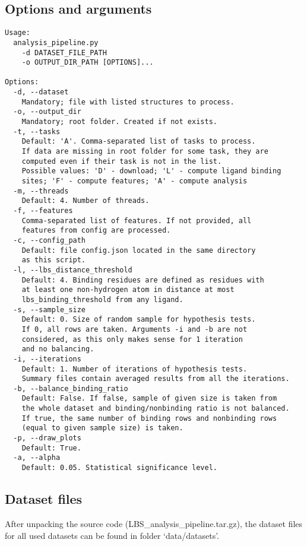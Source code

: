 \documentclass[12pt,a4paper]{report}
\begin{document}
\subsection{Options and arguments}
\begin{Verbatim}[fontsize=\small]
Usage:
  analysis_pipeline.py 
  	-d DATASET_FILE_PATH
  	-o OUTPUT_DIR_PATH [OPTIONS]... 

Options:
  -d, --dataset                
  	Mandatory; file with listed structures to process.
  -o, --output_dir             
  	Mandatory; root folder. Created if not exists.
  -t, --tasks                  
  	Default: 'A'. Comma-separated list of tasks to process. 
  	If data are missing in root folder for some task, they are 
  	computed even if their task is not in the list.
  	Possible values: 'D' - download; 'L' - compute ligand binding 
  	sites; 'F' - compute features; 'A' - compute analysis
  -m, --threads                
  	Default: 4. Number of threads.
  -f, --features               
  	Comma-separated list of features. If not provided, all
  	features from config are processed.
  -c, --config_path            
  	Default: file config.json located in the same directory 
  	as this script.
  -l, --lbs_distance_threshold 
  	Default: 4. Binding residues are defined as residues with 
  	at least one non-hydrogen atom in distance at most 
  	lbs_binding_threshold from any ligand.
  -s, --sample_size            
  	Default: 0. Size of random sample for hypothesis tests. 
  	If 0, all rows are taken. Arguments -i and -b are not
  	considered, as this only makes sense for 1 iteration
  	and no balancing.
  -i, --iterations             
  	Default: 1. Number of iterations of hypothesis tests. 
  	Summary files contain averaged results from all the iterations.
  -b, --balance_binding_ratio  
  	Default: False. If false, sample of given size is taken from
  	the whole dataset and binding/nonbinding ratio is not balanced. 
  	If true, the same number of binding rows and nonbinding rows
  	(equal to given sample size) is taken. 
  -p, --draw_plots             
  	Default: True.
  -a, --alpha                  
  	Default: 0.05. Statistical significance level. 
\end{Verbatim}


\subsection{Dataset files}
After unpacking the source code (LBS\_analysis\_pipeline.tar.gz), the dataset files for all used datasets can be found in folder `data/datasets'.
\end{document}
